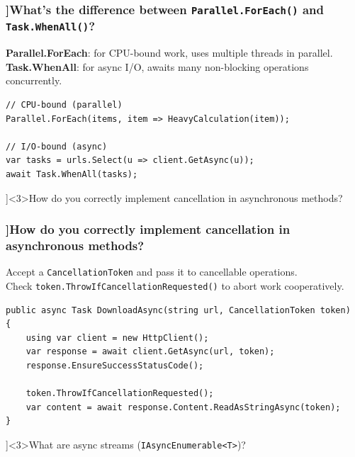 \begin{frame}[fragile]
  \frametitle{\AnswerTitle[\CategoryBadge[OOPColor!20]{C\#} ]{What's the difference between \texttt{Parallel.ForEach()} and \texttt{Task.WhenAll()}?}}

  {\footnotesize
  \textbf{Parallel.ForEach}: for CPU-bound work, uses multiple threads in parallel.\\
  \textbf{Task.WhenAll}: for async I/O, awaits many non-blocking operations concurrently.
  }

  \begin{verbatim}
// CPU-bound (parallel)
Parallel.ForEach(items, item => HeavyCalculation(item));

// I/O-bound (async)
var tasks = urls.Select(u => client.GetAsync(u));
await Task.WhenAll(tasks);
  \end{verbatim}
\end{frame}

\QuestionSlide[\CategoryBadge[PerfColor!20]{Async \& Threading}]<3>{How do you correctly implement cancellation in asynchronous methods?}

\begin{frame}[fragile]
  \frametitle{\AnswerTitle[\CategoryBadge[OOPColor!20]{C\#} ]{How do you correctly implement cancellation in asynchronous methods?}}

  {\footnotesize
  Accept a \texttt{CancellationToken} and pass it to cancellable operations.\\
  Check \texttt{token.ThrowIfCancellationRequested()} to abort work cooperatively.
  }

  \begin{verbatim}
public async Task DownloadAsync(string url, CancellationToken token)
{
    using var client = new HttpClient();
    var response = await client.GetAsync(url, token);
    response.EnsureSuccessStatusCode();

    token.ThrowIfCancellationRequested();
    var content = await response.Content.ReadAsStringAsync(token);
}
  \end{verbatim}
\end{frame}

\QuestionSlide[\CategoryBadge[PerfColor!20]{Async \& Threading}]<3>{What are async streams (\texttt{IAsyncEnumerable<T>})?}

